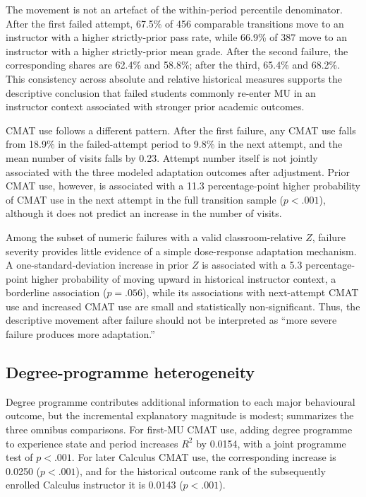 The movement is not an artefact of the within-period percentile denominator. After the first failed attempt, 67.5\% of 456 comparable transitions move to an instructor with a higher strictly-prior pass rate, while 66.9\% of 387 move to an instructor with a higher strictly-prior mean grade. After the second failure, the corresponding shares are 62.4\% and 58.8\%; after the third, 65.4\% and 68.2\%. This consistency across absolute and relative historical measures supports the descriptive conclusion that failed students commonly re-enter MU in an instructor context associated with stronger prior academic outcomes.

CMAT use follows a different pattern. After the first failure, any CMAT use falls from 18.9\% in the failed-attempt period to 9.8\% in the next attempt, and the mean number of visits falls by 0.23. Attempt number itself is not jointly associated with the three modeled adaptation outcomes after adjustment. Prior CMAT use, however, is associated with a 11.3 percentage-point higher probability of CMAT use in the next attempt in the full transition sample ($p<.001$), although it does not predict an increase in the number of visits.

Among the subset of numeric failures with a valid classroom-relative $Z$, failure severity provides little evidence of a simple dose-response adaptation mechanism. A one-standard-deviation increase in prior $Z$ is associated with a 5.3 percentage-point higher probability of moving upward in historical instructor context, a borderline association ($p=.056$), while its associations with next-attempt CMAT use and increased CMAT use are small and statistically non-significant. Thus, the descriptive movement after failure should not be interpreted as ``more severe failure produces more adaptation.''

\subsection{Degree-programme heterogeneity}

Degree programme contributes additional information to each major behavioural outcome, but the incremental explanatory magnitude is modest;  summarizes the three omnibus comparisons. For first-MU CMAT use, adding degree programme to experience state and period increases $R^2$ by 0.0154, with a joint programme test of $p<.001$. For later Calculus CMAT use, the corresponding increase is 0.0250 ($p<.001$), and for the historical outcome rank of the subsequently enrolled Calculus instructor it is 0.0143 ($p<.001$).

